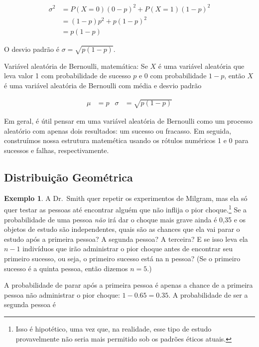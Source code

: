 \documentclass[
]{book}
\theoremstyle{definition}
\theoremstyle{definition}
\newtheorem{example}{Exemplo}[chapter]
\theoremstyle{definition}
\theoremstyle{definition}
\theoremstyle{remark}
\begin{document}
\begin{align*}
\sigma^2 &= {P(X=0)(0-p)^2 + P(X=1)(1-p)^2} \\
    &= {(1-p)p^2 + p(1-p)^2} \\
    &= p(1-p)
\end{align*}

O desvio padrão é \(\sigma=\sqrt{p(1-p)}\).

Variável aleatória de Bernoulli, matemática: Se \(X\) é uma variável aleatória que leva valor 1 com probabilidade de sucesso \(p\) e 0 com probabilidade \(1-p\), então \(X\) é uma variável aleatória de Bernoulli com média e desvio padrão

\begin{align*}
\mu &= p
    &\sigma&= \sqrt{p(1-p)}
\end{align*}

Em geral, é útil pensar em uma variável aleatória de Bernoulli como um processo aleatório com apenas dois resultados: um sucesso ou fracasso. Em seguida, construímos nossa estrutura matemética usando os rótulos numéricos 1 e 0 para sucessos e falhas, respectivamente.

\hypertarget{geometricDistribution2}{%
\subsection{Distribuição Geométrica}\label{geometricDistribution2}}

\begin{example}
\protect\hypertarget{exm:unnamed-chunk-122}{}{\label{exm:unnamed-chunk-122} }A Dr.~Smith quer repetir os experimentos de Milgram, mas ela só quer testar as pessoas até encontrar alguém que não inflija o pior choque.\footnote{Isso é hipotético, uma vez que, na realidade, esse tipo de estudo provavelmente não seria mais permitido sob os padrões éticos atuais.} Se a probabilidade de uma pessoa \emph{não} irá dar o choque mais grave ainda é 0,35 e os objetos de estudo são independentes, quais são as chances que ela vai parar o estudo após a primeira pessoa? A segunda pessoa? A terceira? E se isso leva ela \(n-1\) indivíduos que irão administrar o pior choque antes de encontrar seu primeiro sucesso, ou seja, o primeiro sucesso está na n pessoa? (Se o primeiro sucesso é a quinta pessoa, então dizemos \(n=5\).)
\end{example}

A probabilidade de parar após a primeira pessoa é apenas a chance de a primeira pessoa não administrar o pior choque: \(1-0.65=0.35\). A probabilidade de ser a segunda pessoa é
\end{document}
